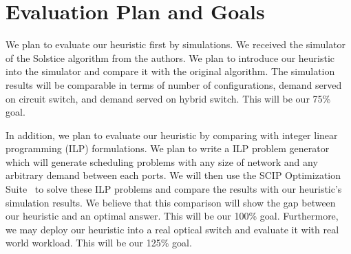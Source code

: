 \section{Evaluation Plan and Goals}
\label{sec:goal}
We plan to evaluate our heuristic first by simulations. We received the
simulator of the Solstice algorithm from the authors. We plan to introduce
our heuristic into the simulator and compare it with the original algorithm.
The simulation results will be comparable in terms of number of configurations,
demand served on circuit switch, and demand served on hybrid switch. This will
be our 75\% goal.

In addition, we plan to evaluate our heuristic by comparing with integer
linear programming (ILP) formulations. We plan to write a ILP problem
generator which will generate scheduling problems with any size of
network and any arbitrary demand between each ports. We will then use
the SCIP Optimization Suite~\cite{SCIP} to solve these ILP problems and
compare the results with our heuristic's simulation results. We believe
that this comparison will show the gap between our heuristic and an
optimal answer. This will be our 100\% goal. Furthermore, we may deploy
our heuristic into a real optical switch and evaluate it with real world
workload. This will be our 125\% goal.
